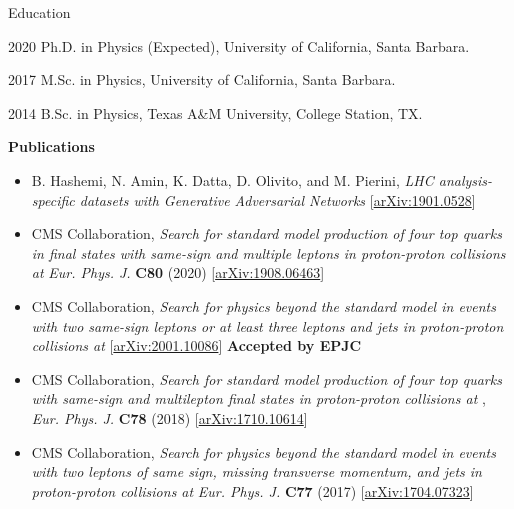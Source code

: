 \begin{vitae}

\begin{vitaesection}{Education}
\vspace{-0.1cm}
\item [2020] Ph.D. in Physics (Expected), University of California, Santa Barbara.
\item [2017] M.Sc. in Physics, University of California, Santa Barbara.
\item [2014] B.Sc. in Physics, Texas A\&M University, College Station, TX.
\end{vitaesection}

\textbf{Publications}

    \begin{itemize}
        \item B. Hashemi, N. Amin, K. Datta, D. Olivito, and M. Pierini, \textit{LHC analysis-specific datasets with Generative Adversarial Networks} [\href{https://arxiv.org/abs/1901.05282}{arXiv:1901.0528}]

        \item CMS Collaboration, \textit{Search for standard model production of four top quarks in final states with same-sign and multiple leptons in proton-proton collisions at \sthirteen} 
            \textit{Eur. Phys. J.} \textbf{C80} (2020) 
            [\href{https://arxiv.org/abs/1908.06463}{arXiv:1908.06463}]
        \item CMS Collaboration, \textit{Search for physics beyond the standard model in events with two same-sign leptons or at least three leptons and jets in proton-proton collisions at \sthirteen} 
            [\href{https://arxiv.org/abs/2001.10086}{arXiv:2001.10086}]
            \textbf{Accepted by EPJC}
        \item CMS Collaboration, \textit{Search for standard model production of four top quarks with same-sign and multilepton final states in proton-proton collisions at \sthirteen},
            \textit{Eur. Phys. J.} \textbf{C78} (2018) 
            [\href{https://arxiv.org/abs/1710.10614}{arXiv:1710.10614}]
        \item CMS Collaboration, \textit{Search for physics beyond the standard model in events with two leptons of same sign, missing transverse momentum, and jets in proton-proton collisions at \sthirteen}
            \textit{Eur. Phys. J.} \textbf{C77} (2017) 
            [\href{https://arxiv.org/abs/1704.07323}{arXiv:1704.07323}]
    \end{itemize}

\end{vitae}
